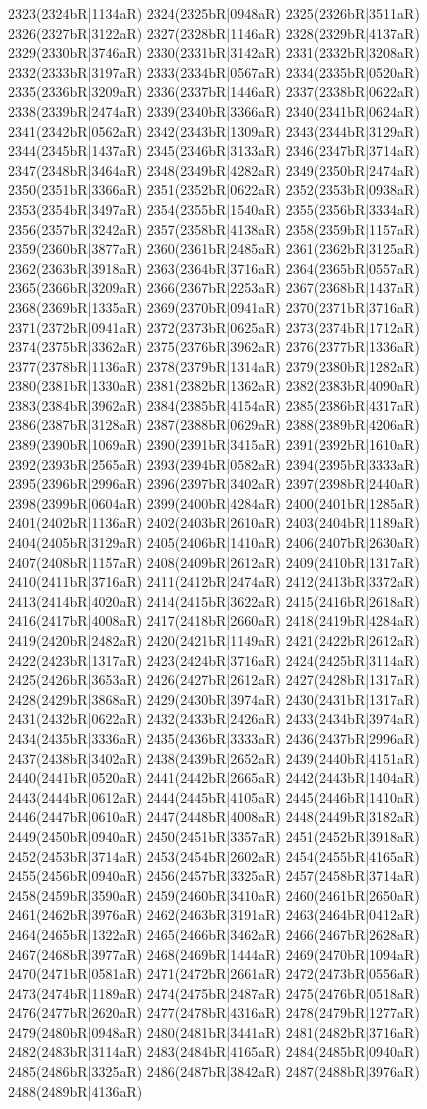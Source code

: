 2323(2324bR|1134aR) 2324(2325bR|0948aR) 2325(2326bR|3511aR) 2326(2327bR|3122aR) 2327(2328bR|1146aR) 2328(2329bR|4137aR) 2329(2330bR|3746aR) 2330(2331bR|3142aR) 2331(2332bR|3208aR) 2332(2333bR|3197aR) 2333(2334bR|0567aR) 2334(2335bR|0520aR) 2335(2336bR|3209aR) 2336(2337bR|1446aR) 2337(2338bR|0622aR) 2338(2339bR|2474aR) 2339(2340bR|3366aR) 2340(2341bR|0624aR) 2341(2342bR|0562aR) 2342(2343bR|1309aR) 2343(2344bR|3129aR) 2344(2345bR|1437aR) 2345(2346bR|3133aR) 2346(2347bR|3714aR) 2347(2348bR|3464aR) 2348(2349bR|4282aR) 2349(2350bR|2474aR) 2350(2351bR|3366aR) 2351(2352bR|0622aR) 2352(2353bR|0938aR) 2353(2354bR|3497aR) 2354(2355bR|1540aR) 2355(2356bR|3334aR) 2356(2357bR|3242aR) 2357(2358bR|4138aR) 2358(2359bR|1157aR) 2359(2360bR|3877aR) 2360(2361bR|2485aR) 2361(2362bR|3125aR) 2362(2363bR|3918aR) 2363(2364bR|3716aR) 2364(2365bR|0557aR) 2365(2366bR|3209aR) 2366(2367bR|2253aR) 2367(2368bR|1437aR) 2368(2369bR|1335aR) 2369(2370bR|0941aR) 2370(2371bR|3716aR) 2371(2372bR|0941aR) 2372(2373bR|0625aR) 2373(2374bR|1712aR) 2374(2375bR|3362aR) 2375(2376bR|3962aR) 2376(2377bR|1336aR) 2377(2378bR|1136aR) 2378(2379bR|1314aR) 2379(2380bR|1282aR) 2380(2381bR|1330aR) 2381(2382bR|1362aR) 2382(2383bR|4090aR) 2383(2384bR|3962aR) 2384(2385bR|4154aR) 2385(2386bR|4317aR) 2386(2387bR|3128aR) 2387(2388bR|0629aR) 2388(2389bR|4206aR) 2389(2390bR|1069aR) 2390(2391bR|3415aR) 2391(2392bR|1610aR) 2392(2393bR|2565aR) 2393(2394bR|0582aR) 2394(2395bR|3333aR) 2395(2396bR|2996aR) 2396(2397bR|3402aR) 2397(2398bR|2440aR) 2398(2399bR|0604aR) 2399(2400bR|4284aR) 2400(2401bR|1285aR) 2401(2402bR|1136aR) 2402(2403bR|2610aR) 2403(2404bR|1189aR) 2404(2405bR|3129aR) 2405(2406bR|1410aR) 2406(2407bR|2630aR) 2407(2408bR|1157aR) 2408(2409bR|2612aR) 2409(2410bR|1317aR) 2410(2411bR|3716aR) 2411(2412bR|2474aR) 2412(2413bR|3372aR) 2413(2414bR|4020aR) 2414(2415bR|3622aR) 2415(2416bR|2618aR) 2416(2417bR|4008aR) 2417(2418bR|2660aR) 2418(2419bR|4284aR) 2419(2420bR|2482aR) 2420(2421bR|1149aR) 2421(2422bR|2612aR) 2422(2423bR|1317aR) 2423(2424bR|3716aR) 2424(2425bR|3114aR) 2425(2426bR|3653aR) 2426(2427bR|2612aR) 2427(2428bR|1317aR) 2428(2429bR|3868aR) 2429(2430bR|3974aR) 2430(2431bR|1317aR) 2431(2432bR|0622aR) 2432(2433bR|2426aR) 2433(2434bR|3974aR) 2434(2435bR|3336aR) 2435(2436bR|3333aR) 2436(2437bR|2996aR) 2437(2438bR|3402aR) 2438(2439bR|2652aR) 2439(2440bR|4151aR) 2440(2441bR|0520aR) 2441(2442bR|2665aR) 2442(2443bR|1404aR) 2443(2444bR|0612aR) 2444(2445bR|4105aR) 2445(2446bR|1410aR) 2446(2447bR|0610aR) 2447(2448bR|4008aR) 2448(2449bR|3182aR) 2449(2450bR|0940aR) 2450(2451bR|3357aR) 2451(2452bR|3918aR) 2452(2453bR|3714aR) 2453(2454bR|2602aR) 2454(2455bR|4165aR) 2455(2456bR|0940aR) 2456(2457bR|3325aR) 2457(2458bR|3714aR) 2458(2459bR|3590aR) 2459(2460bR|3410aR) 2460(2461bR|2650aR) 2461(2462bR|3976aR) 2462(2463bR|3191aR) 2463(2464bR|0412aR) 2464(2465bR|1322aR) 2465(2466bR|3462aR) 2466(2467bR|2628aR) 2467(2468bR|3977aR) 2468(2469bR|1444aR) 2469(2470bR|1094aR) 2470(2471bR|0581aR) 2471(2472bR|2661aR) 2472(2473bR|0556aR) 2473(2474bR|1189aR) 2474(2475bR|2487aR) 2475(2476bR|0518aR) 2476(2477bR|2620aR) 2477(2478bR|4316aR) 2478(2479bR|1277aR) 2479(2480bR|0948aR) 2480(2481bR|3441aR) 2481(2482bR|3716aR) 2482(2483bR|3114aR) 2483(2484bR|4165aR) 2484(2485bR|0940aR) 2485(2486bR|3325aR) 2486(2487bR|3842aR) 2487(2488bR|3976aR) 2488(2489bR|4136aR) 